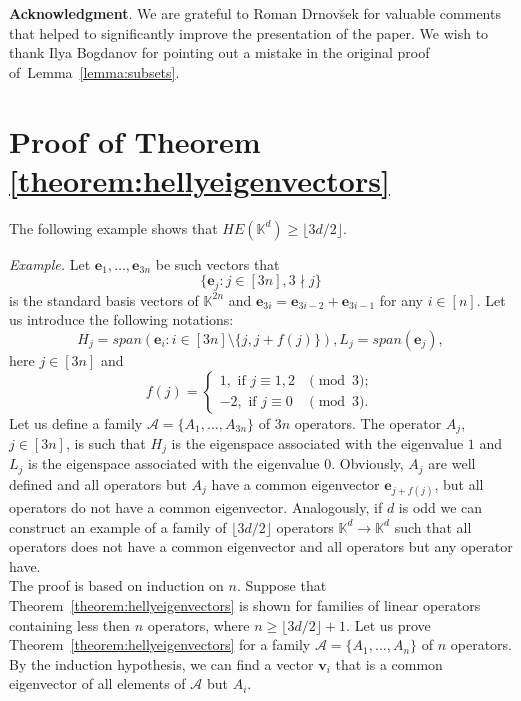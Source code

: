 \documentclass[12pt,nopagetitle]{article}
\theoremstyle{plain}
\theoremstyle{definition}
\begin{document}
{\bf Acknowledgment}. We are grateful to Roman Drnov\u{s}ek for valuable comments that helped to significantly improve the presentation of the paper. We wish to thank Ilya Bogdanov for pointing out a mistake in the original proof of~Lemma~\ref{lemma:subsets}.

\section{Proof of Theorem \ref{theorem:hellyeigenvectors}} 
\label{section:proofoftheoremhellyeigenvectors}
	
The following example shows that $HE(\mathbb K^d)\geq \lfloor 3d/2\rfloor$.
	
	\emph{Example.} Let $\mathbf e_1, \dots, \mathbf e_{3n}$ be such vectors that 
	$$\{\mathbf e_j: j\in[3n], 3\nmid j\}$$ 
	is the standard basis vectors of $\mathbb K^{2n}$ and $\mathbf e_{3i}=\mathbf e_{3i-2}+\mathbf e_{3i-1}$ for any $i\in[n]$. Let us introduce the following notations: $$H_j=span (\mathbf e_{i}:i\in[3n]\setminus \{j, j+f(j)\}), L_j=span(\mathbf e_j),$$ 
here $j\in[3n]$ and
$$f(j)=\begin{cases}1, \text{ if } j\equiv1,2&\pmod{3};
\\-2,\text{ if } j\equiv 0&\pmod{3}.
\end{cases}$$
Let us define a family $\mathcal A=\{A_1,\dots, A_{3n}\}$ of $3n$ operators. The operator $A_{j}$, $j\in [3n]$, is such that $H_j$ is the eigenspace associated with the eigenvalue $1$ and $L_j$ is the eigenspace associated with the eigenvalue $0$.
	Obviously, $A_j$ are well defined and all operators but $A_j$ have a common eigenvector $\mathbf e_{j+f(j)} $, but all operators do not have a common eigenvector. Analogously, if $d$ is odd we can construct an example of a family of $\lfloor3d/2\rfloor$ operators $\mathbb K^d\to\mathbb K^d$ such that all operators does not have a common eigenvector and all operators but any operator have.
\\[2pt]

The proof is based on induction on $n$. Suppose that Theorem~\ref{theorem:hellyeigenvectors} is shown for families of linear operators containing less then $n$ operators, where $n\geqslant \lfloor3d/2\rfloor +1$. Let us prove Theorem~\ref{theorem:hellyeigenvectors} for a family $\mathcal{A}=\{A_1, \dots, A_n\}$ of $n$ operators. By the induction hypothesis, we can find a vector $\mathbf v_i$ that is a common eigenvector of all elements of $\mathcal{A}$ but $A_i$.
		
\end{document}
